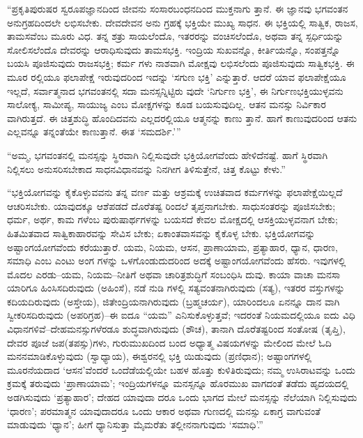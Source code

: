 “ಪ್ರಕೃತಿಪುರುಷರ ಸ್ವರೂಪಜ್ಞಾನದಿಂದ ಜೀವನು ಸಂಸಾರಬಂಧನದಿಂದ ಮುಕ್ತನಾಗು ತ್ತಾನೆ. ಈ ಜ್ಞಾನವು ಭಗವಂತನ ಅನುಗ್ರಹದಿಂದಲೇ ಲಭಿಸಬೇಕು. ದೇವದೇವನ ಅನು ಗ್ರಹಕ್ಕೆ ಭಕ್ತಿಯೇ ಮುಖ್ಯ ಸಾಧನ. ಈ ಭಕ್ತಿಯಲ್ಲಿ ಸಾತ್ವಿಕ, ರಾಜಸ, ತಾಮಸವೆಂಬ ಮೂರು ವಿಧ. ತನ್ನ ಶತ್ರು ಸಾಯಲೆಂದೊ, ಇತರರನ್ನು ವಂಚಿಸಲೆಂದೊ, ಅಥವಾ ತನ್ನ ಸ್ಪರ್ಧಿಯನ್ನು ಸೋಲಿಸಲೆಂದೊ ದೇವರನ್ನು ಆರಾಧಿಸುವುದು ತಾಮಸಭಕ್ತಿ. ಇಂದ್ರಿಯ ಸುಖವನ್ನೊ, ಕೀರ್ತಿಯನ್ನೊ, ಸಂಪತ್ತನ್ನೊ ಬಯಸಿ ಪೂಜಿಸುವುದು ರಾಜಸಭಕ್ತಿ; ಕರ್ಮ ಗಳು ನಾಶವಾಗಿ ಮೋಕ್ಷವು ಲಭಿಸಲೆಂದು ಪೂಜಿಸುವುದು ಸಾತ್ವಿಕಭಕ್ತಿ. ಈ ಮೂರ ರಲ್ಲಿಯೂ ಫಲಾಪೇಕ್ಷೆ ಇರುವುದರಿಂದ ಇದನ್ನು ‘ಸಗುಣ ಭಕ್ತಿ’ ಎನ್ನುತ್ತಾರೆ. ಆದರೆ ಯಾವ ಫಲಾಪೇಕ್ಷೆಯೂ ಇಲ್ಲದೆ, ಸರ್ವಾತ್ಮನಾದ ಭಗವಂತನಲ್ಲಿ ಸದಾ ಮನಸ್ಸನ್ನಿಟ್ಟಿರು ವುದೇ ‘ನಿರ್ಗುಣ ಭಕ್ತಿ’, ಈ ನಿರ್ಗುಣಭಕ್ತಿಯುಳ್ಳವನು ಸಾಲೋಕ್ಯ, ಸಾಮೀಪ್ಯ, ಸಾಯುಜ್ಯ ಎಂಬ ಮೋಕ್ಷಗಳನ್ನು ಕೂಡ ಬಯಸುವುದಿಲ್ಲ. ಆತನ ಮನಸ್ಸು ನಿರ್ವಿಕಾರ ವಾಗಿರುತ್ತದೆ. ಈ ಚಿತ್ತಶುದ್ಧಿ ಹೊಂದಿದವನು ಎಲ್ಲದರಲ್ಲಿಯೂ ಆತ್ಮನನ್ನು ಕಾಣು ತ್ತಾನೆ. ಹಾಗೆ ಕಾಣುವುದರಿಂದ ಆತನು ಎಲ್ಲವನ್ನೂ ತನ್ನಂತೆಯೇ ಕಾಣುತ್ತಾನೆ. ಈತ ‘ಸಮದರ್ಶಿ.’”

“ಅಮ್ಮ, ಭಗವಂತನಲ್ಲಿ ಮನಸ್ಸನ್ನು ಸ್ಥಿರವಾಗಿ ನಿಲ್ಲಿಸುವುದೇ ಭಕ್ತಿಯೋಗವೆಂದು ಹೇಳಿದೆನಷ್ಟೆ. ಹಾಗೆ ಸ್ಥಿರವಾಗಿ ನಿಲ್ಲಿಸಲು ಅನುಸರಿಸಬೇಕಾದ ಸಾಧನವಿಧಾನವನ್ನು ನಿನಗೀಗ ತಿಳಿಸುತ್ತೇನೆ, ಚಿತ್ತ ಕೊಟ್ಟು ಕೇಳು.”

“ಭಕ್ತಿಯೋಗವನ್ನು ಕೈಕೊಳ್ಳುವವನು ತನ್ನ ವರ್ಣ ಮತ್ತು ಆಶ್ರಮಕ್ಕೆ ಉಚಿತವಾದ ಕರ್ಮಗಳನ್ನು ಫಲಾಪೇಕ್ಷೆಯಿಲ್ಲದೆ ಆಚರಿಸಬೇಕು. ಯಾವುದಕ್ಕೂ ಆಶೆಪಡದೆ ದೊರೆತಷ್ಟ ರಿಂದಲೆ ತೃಪ್ತನಾಗಬೇಕು. ಸಾಧುಸಂತರನ್ನು ಪೂಜಿಸಬೇಕು; ಧರ್ಮ, ಅರ್ಥ, ಕಾಮ ಗಳೆಂಬ ಪುರುಷಾರ್ಥಗಳನ್ನು ಬಯಸದೆ ಕೇವಲ ಮೋಕ್ಷದಲ್ಲಿ ಆಸಕ್ತಿಯುಳ್ಳವನಾಗ ಬೇಕು; ಹಿತಮಿತವಾದ ಸಾತ್ವಿಕಾಹಾರವನ್ನು ಸೇವಿಸ ಬೇಕು; ಏಕಾಂತವಾಸವನ್ನು ಕೈಕೊಳ್ಳ ಬೇಕು. ಭಕ್ತಿಯೋಗವನ್ನು ಅಷ್ಟಾಂಗಯೋಗವೆಂದು ಕರೆಯುತ್ತಾರೆ. ಯಮ, ನಿಯಮ, ಆಸನ, ಪ್ರಾಣಾಯಾಮ, ಪ್ರತ್ಯಾಹಾರ, ಧ್ಯಾನ, ಧಾರಣ, ಸಮಾಧಿ ಎಂಬ ಎಂಟು ಅಂಗ ಗಳನ್ನು ಒಳಗೊಂಡುದುದರಿಂದ ಅದಕ್ಕೆ ಅಷ್ಟಾಂಗಯೋಗವೆಂದು ಹೆಸರು. ಇವುಗಳಲ್ಲಿ ಮೊದಲ ಎರಡು–ಯಮ, ನಿಯಮ–ನೀತಿಗೆ ಅಥವಾ ಚಾರಿತ್ರಶುದ್ಧಿಗೆ ಸಂಬಂಧಿಸಿ ದುವು. ಕಾಯಾ ವಾಚಾ ಮನಸಾ ಯಾರಿಗೂ ಹಿಂಸಿಸದಿರುವುದು (ಅಹಿಂಸೆ), ನಡೆ ನುಡಿ ಗಳಲ್ಲಿ ಸತ್ಯವಂತನಾಗಿರುವುದು (ಸತ್ಯ), ಇತರರ ವಸ್ತುಗಳನ್ನು ಕದಿಯದಿರುವುದು (ಅಸ್ತೇಯ), ಜಿತೇಂದ್ರಿಯನಾಗಿರುವುದು (ಬ್ರಹ್ಮಚರ್ಯ), ಯಾರಿಂದಲೂ ಏನನ್ನೂ ದಾನ ವಾಗಿ ಸ್ವೀಕರಿಸದಿರುವುದು (ಅಪರಿಗ್ರಹ)–ಈ ಐದೂ “ಯಮ” ಎನಿಸುಕೊಳ್ಳುತ್ತವೆ; ಇದರಂತೆ ನಿಯಮದಲ್ಲಿಯೂ ಐದು ವಿಧಿ ವಿಧಾನಗಳಿವೆ–ದೇಹಮನಸ್ಸುಗಳೆರಡೂ ಶುದ್ಧವಾಗಿರುವುದು (ಶೌಚ), ತಾನಾಗಿ ದೊರೆತಷ್ಟರಿಂದ ಸಂತೋಷ (ತೃಪ್ತಿ), ದೇವರ ಪೂಜೆ ಜಪ(ತಪಸ್ಸು)ಗಳು, ಗುರುಮುಖದಿಂದ ಬಂದ ಅಧ್ಯಾತ್ಮ ವಿಷಯಗಳನ್ನು ಮೇಲಿಂದ ಮೇಲೆ ಓದಿ ಮನನಮಾಡಿಕೊಳ್ಳುವುದು (ಸ್ವಾಧ್ಯಾಯ), ಈಶ್ವರನಲ್ಲಿ ಭಕ್ತಿ ಯಿಡುವುದು (ಪ್ರಣಿಧಾನ); ಅಷ್ಟಾಂಗಗಳಲ್ಲಿ ಮೂರನೆಯದಾದ ‘ಆಸನ’ವೆಂದರೆ ಒಂದೆಡೆಯಲ್ಲಿಯೇ ಬಹಳ ಹೊತ್ತು ಕುಳಿತಿರುವುದು; ನಮ್ಮ ಉಸಿರಾಟವನ್ನು ಒಂದು ಕ್ರಮಕ್ಕೆ ತರುವುದು ‘ಪ್ರಾಣಾಯಾಮ’; ಇಂದ್ರಿಯಗಳನ್ನೂ ಮನಸ್ಸನ್ನೂ ಹೊರಮುಖ ವಾಗದಂತೆ ತಡೆದು ಹೃದಯದಲ್ಲಿ ಅಡಗಿಸುವುದು ‘ಪ್ರತ್ಯಾಹಾರ’; ದೇಹದ ಯಾವುದಾ ದರೂ ಒಂದು ಭಾಗದ ಮೇಲೆ ಮನಸ್ಸನ್ನು ನೆಲೆಯಾಗಿ ನಿಲ್ಲಿಸುವುದು ‘ಧಾರಣ’; ಪರಮಾತ್ಮನ ಯಾವುದಾದರೂ ಒಂದು ಆಕಾರ ಅಥವಾ ಗುಣದಲ್ಲಿ ಮನಸ್ಸು ಏಕಾಗ್ರ ವಾಗುವಂತೆ ಮಾಡುವುದು ‘ಧ್ಯಾನ’; ಹೀಗೆ ಧ್ಯಾನಿಸುತ್ತಾ ಮೈಮರೆತು ತಲ್ಲೀನನಾಗುವುದು ‘ಸಮಾಧಿ’.”

